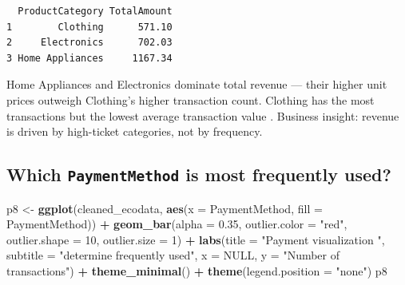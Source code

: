 \documentclass[
]{article}
\newenvironment{Shaded}{\begin{snugshade}}{\end{snugshade}}
\newcommand{\AttributeTok}[1]{\textcolor[rgb]{0.13,0.29,0.53}{#1}}
\newcommand{\ConstantTok}[1]{\textcolor[rgb]{0.56,0.35,0.01}{#1}}
\newcommand{\DecValTok}[1]{\textcolor[rgb]{0.00,0.00,0.81}{#1}}
\newcommand{\FloatTok}[1]{\textcolor[rgb]{0.00,0.00,0.81}{#1}}
\newcommand{\FunctionTok}[1]{\textcolor[rgb]{0.13,0.29,0.53}{\textbf{#1}}}
\newcommand{\NormalTok}[1]{#1}
\newcommand{\OtherTok}[1]{\textcolor[rgb]{0.56,0.35,0.01}{#1}}
\newcommand{\SpecialCharTok}[1]{\textcolor[rgb]{0.81,0.36,0.00}{\textbf{#1}}}
\newcommand{\StringTok}[1]{\textcolor[rgb]{0.31,0.60,0.02}{#1}}
\begin{document}
\begin{Shaded}
\end{Shaded}

\begin{verbatim}
  ProductCategory TotalAmount
1        Clothing      571.10
2     Electronics      702.03
3 Home Appliances     1167.34
\end{verbatim}

Home Appliances and Electronics dominate total revenue --- their higher
unit prices outweigh Clothing's higher transaction count. Clothing has
the most transactions but the lowest average transaction value .
Business insight: revenue is driven by high-ticket categories, not by
frequency.

\subsection{\texorpdfstring{Which \texttt{PaymentMethod} is most
frequently
used?}{Which PaymentMethod is most frequently used?}}\label{which-paymentmethod-is-most-frequently-used}

\begin{Shaded}
\begin{Highlighting}[]
\NormalTok{p8 }\OtherTok{\textless{}{-}} \FunctionTok{ggplot}\NormalTok{(cleaned\_ecodata, }\FunctionTok{aes}\NormalTok{(}\AttributeTok{x =}\NormalTok{ PaymentMethod, }\AttributeTok{fill =}\NormalTok{ PaymentMethod)) }\SpecialCharTok{+} \FunctionTok{geom\_bar}\NormalTok{(}\AttributeTok{alpha =} \FloatTok{0.35}\NormalTok{,}
    \AttributeTok{outlier.color =} \StringTok{"red"}\NormalTok{, }\AttributeTok{outlier.shape =} \DecValTok{10}\NormalTok{, }\AttributeTok{outlier.size =} \DecValTok{1}\NormalTok{) }\SpecialCharTok{+} \FunctionTok{labs}\NormalTok{(}\AttributeTok{title =} \StringTok{"Payment visualization "}\NormalTok{,}
    \AttributeTok{subtitle =} \StringTok{"determine frequently used"}\NormalTok{, }\AttributeTok{x =} \ConstantTok{NULL}\NormalTok{, }\AttributeTok{y =} \StringTok{"Number of transactions"}\NormalTok{) }\SpecialCharTok{+}
    \FunctionTok{theme\_minimal}\NormalTok{() }\SpecialCharTok{+} \FunctionTok{theme}\NormalTok{(}\AttributeTok{legend.position =} \StringTok{"none"}\NormalTok{)}
\NormalTok{p8}
\end{Highlighting}
\end{Shaded}
\end{document}
